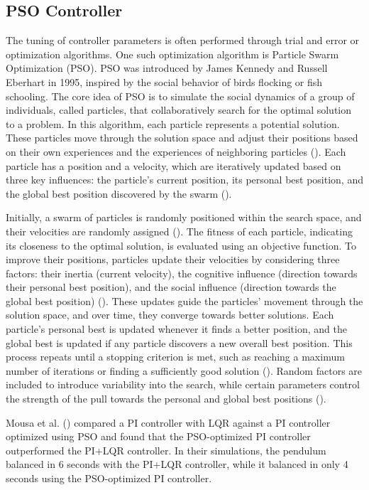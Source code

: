 \subsection{PSO Controller}

The tuning of controller parameters is often performed through trial and error or optimization algorithms. One such optimization algorithm is Particle Swarm Optimization (PSO). PSO was introduced by James Kennedy and Russell Eberhart in 1995, inspired by the social behavior of birds flocking or fish schooling. The core idea of PSO is to simulate the social dynamics of a group of individuals, called particles, that collaboratively search for the optimal solution to a problem. In this algorithm, each particle represents a potential solution. These particles move through the solution space and adjust their positions based on their own experiences and the experiences of neighboring particles (\cite{kennedy_discrete_1997}). Each particle has a position and a velocity, which are iteratively updated based on three key influences: the particle's current position, its personal best position, and the global best position discovered by the swarm (\cite{eberhart_new_1995}).

Initially, a swarm of particles is randomly positioned within the search space, and their velocities are randomly assigned (\cite{shi_parameter_1998}). The fitness of each particle, indicating its closeness to the optimal solution, is evaluated using an objective function. To improve their positions, particles update their velocities by considering three factors: their inertia (current velocity), the cognitive influence (direction towards their personal best position), and the social influence (direction towards the global best position) (\cite{eberhart_new_1995}). These updates guide the particles' movement through the solution space, and over time, they converge towards better solutions. Each particle's personal best is updated whenever it finds a better position, and the global best is updated if any particle discovers a new overall best position. This process repeats until a stopping criterion is met, such as reaching a maximum number of iterations or finding a sufficiently good solution (\cite{angeline_evolutionary_1998}). Random factors are included to introduce variability into the search, while certain parameters control the strength of the pull towards the personal and global best positions (\cite{ozcan_analysis_1998}).

Mousa et al. (\citeyear{mousa_stabilizing_2015}) compared a PI controller with LQR against a PI controller optimized using PSO and found that the PSO-optimized PI controller outperformed the PI+LQR controller. In their simulations, the pendulum balanced in 6 seconds with the PI+LQR controller, while it balanced in only 4 seconds using the PSO-optimized PI controller.

